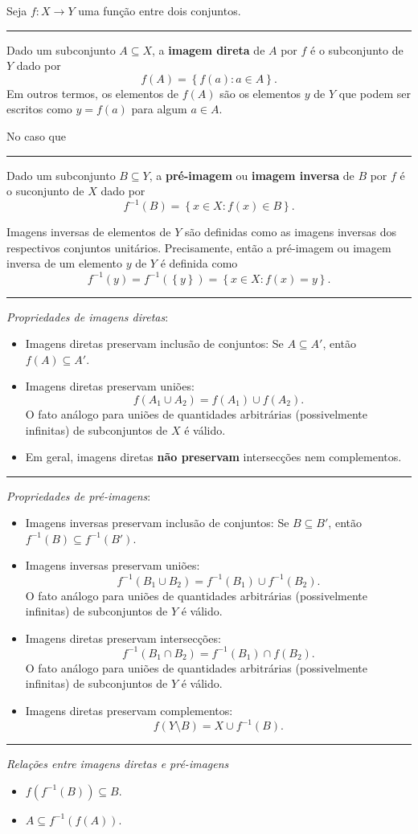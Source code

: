 Seja $f\colon X\to Y$ uma função entre dois conjuntos.

\hrule

Dado um subconjunto $A\subseteq X$, a \textbf{imagem direta} de $A$ por $f$ é o subconjunto de $Y$ dado por
\[f(A)=\left\{f(a):a\in A\right\}.\]
Em outros termos, os elementos de $f(A)$ são os elementos $y$ de $Y$ que podem ser escritos como $y=f(a)$ para algum $a\in A$.

No caso que 
\hrule

Dado um subconjunto $B\subseteq Y$, a \textbf{pré-imagem} ou \textbf{imagem inversa} de $B$ por $f$ é o suconjunto de $X$ dado por
\[f^{-1}(B)=\left\{x\in X:f(x)\in B\right\}.\]

Imagens inversas de elementos de $Y$ são definidas como as imagens inversas dos respectivos conjuntos unitários. Precisamente, então a pré-imagem ou imagem inversa de um elemento $y$ de $Y$ é definida como
\[f^{-1}(y)=f^{-1}(\left\{y\right\})=\left\{x\in X:f(x)=y\right\}.\]

\hrule

\textit{Propriedades de imagens diretas}:
\begin{itemize}
	\item Imagens diretas preservam inclusão de conjuntos: Se $A\subseteq A'$, então $f(A)\subseteq A'$.
	\item Imagens diretas preservam uniões:
	\[f(A_1\cup A_2)=f(A_1)\cup f(A_2).\]
	O fato análogo para uniões de quantidades arbitrárias (possivelmente infinitas) de subconjuntos de $X$ é válido.
	\item Em geral, imagens diretas \textbf{não preservam} intersecções nem complementos.
\end{itemize}

\hrule

\textit{Propriedades de pré-imagens}:
\begin{itemize}
	\item Imagens inversas preservam inclusão de conjuntos: Se $B\subseteq B'$, então $f^{-1}(B)\subseteq f^{-1}(B')$.
	\item Imagens inversas preservam uniões:
	\[f^{-1}(B_1\cup B_2)=f^{-1}(B_1)\cup f^{-1}(B_2).\]
	O fato análogo para uniões de quantidades arbitrárias (possivelmente infinitas) de subconjuntos de $Y$ é válido.
	\item Imagens diretas preservam intersecções:
	\[f^{-1}(B_1\cap B_2)=f^{-1}(B_1)\cap f(B_2).\]
	O fato análogo para uniões de quantidades arbitrárias (possivelmente infinitas) de subconjuntos de $Y$ é válido.
	\item Imagens diretas preservam complementos:
	\[f(Y\setminus B)=X\cup f^{-1}(B).\]
\end{itemize}

\hrule

\textit{Relações entre imagens diretas e pré-imagens}
\begin{itemize}
	\item $f(f^{-1}(B))\subseteq B$.
	\item $A\subseteq f^{-1}(f(A))$.
\end{itemize}